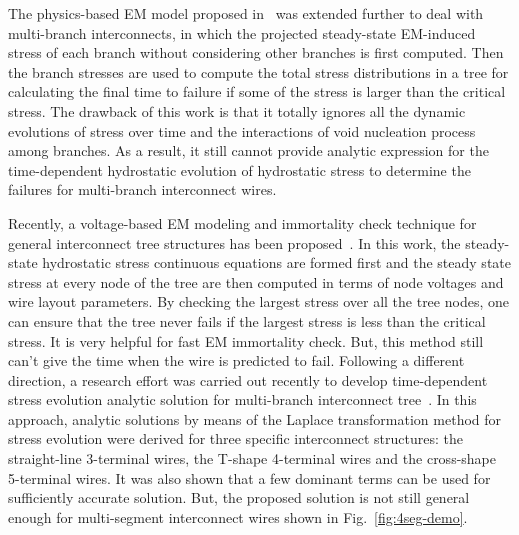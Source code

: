 The physics-based EM model proposed
in~\cite{HuangYu:DAC'14,HuangTan:TCAD'16} was extended further to deal
with multi-branch interconnects, in which the projected steady-state
EM-induced stress of each branch without considering other branches is
first computed. Then the branch stresses are used to compute the total
stress distributions in a tree for calculating the final time to
failure if some of the stress is larger than the critical stress. The
drawback of this work is that it totally ignores all the dynamic
evolutions of stress over time and the interactions of void nucleation
process among branches. As a result, it still cannot provide analytic
expression for the time-dependent hydrostatic evolution of hydrostatic
stress to determine the failures for multi-branch interconnect wires.

Recently, a voltage-based EM modeling and immortality check technique
for general interconnect tree structures has been
proposed~\cite{SunDemircan:ICCAD'16}. In this work, the steady-state
hydrostatic stress continuous equations are formed first and the
steady state stress at every node of the tree are then computed in
terms of node voltages and wire layout parameters. By checking the
largest stress over all the tree nodes, one can ensure that the tree
never fails if the largest stress is less than the critical stress. It
is very helpful for fast EM immortality check. But, this method still
can't give the time when the wire is predicted to fail. Following a
different direction, a research effort was carried out recently to
develop time-dependent stress evolution analytic solution for
multi-branch interconnect
tree~\cite{ChenHuang:DAC'15,ChenTan:TCAD'16}.  In this approach,
analytic solutions by means of the Laplace transformation method for
stress evolution were derived for three specific interconnect
structures: the straight-line 3-terminal wires, the T-shape 4-terminal
wires and the cross-shape 5-terminal wires. It was also shown that a
few dominant terms can be used for sufficiently accurate
solution. But, the proposed solution is not still general enough for
multi-segment interconnect wires shown in Fig.~\ref{fig:4seg-demo}.




